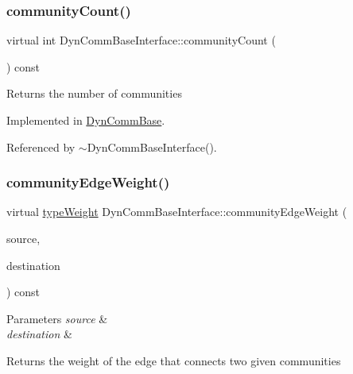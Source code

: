 \subsubsection{\texorpdfstring{community\+Count()}{communityCount()}}
{\footnotesize\ttfamily virtual int Dyn\+Comm\+Base\+Interface\+::community\+Count (\begin{DoxyParamCaption}{ }\end{DoxyParamCaption}) const\hspace{0.3cm}{\ttfamily [pure virtual]}}

\begin{DoxyReturn}{Returns}
the number of communities 
\end{DoxyReturn}


Implemented in \hyperlink{classDynCommBase_add5d1d59a3f20b4ba039342b31551fb3}{Dyn\+Comm\+Base}.



Referenced by $\sim$\+Dyn\+Comm\+Base\+Interface().

\mbox{\label{classDynCommBaseInterface_a17c322600ba39050005153845dfd3021}} 
\subsubsection{\texorpdfstring{community\+Edge\+Weight()}{communityEdgeWeight()}}
{\footnotesize\ttfamily virtual \hyperlink{edge_8h_a2e7ea3be891ac8b52f749ec73fee6dd2}{type\+Weight} Dyn\+Comm\+Base\+Interface\+::community\+Edge\+Weight (\begin{DoxyParamCaption}\item[{\hyperlink{graphUndirectedGroupable_8h_a914da95c9ea7f14f4b7f875c36818556}{type\+Community}}]{source,  }\item[{\hyperlink{graphUndirectedGroupable_8h_a914da95c9ea7f14f4b7f875c36818556}{type\+Community}}]{destination }\end{DoxyParamCaption}) const\hspace{0.3cm}{\ttfamily [pure virtual]}}


\begin{DoxyParams}{Parameters}
{\em source} & \\
\hline
{\em destination} & \\
\hline
\end{DoxyParams}
\begin{DoxyReturn}{Returns}
the weight of the edge that connects two given communities 
\end{DoxyReturn}


